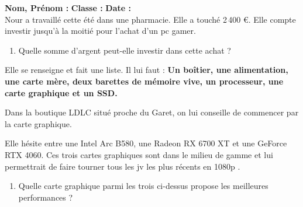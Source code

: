 



\textbf{Nom, Prénom :} \hspace{8cm} \textbf{Classe :} \hspace{3cm} \textbf{Date :}\\

Nour a travaillé cette été dans une pharmacie. Elle a touché 2\,400 \euro{}. Elle compte investir jusqu'à la moitié pour l'achat d'un pc gamer. 

\begin{enumerate}
  \item[1.] Quelle somme d'argent peut-elle investir dans cette achat ?
\end{enumerate}
\Pointilles[2]

\begin{multicols}{2}
Elle se renseigne et fait une liste. Il lui faut : \textbf{Un boîtier, une alimentation, une carte mère, deux barettes de mémoire vive, un processeur, une carte graphique et un SSD.}


Dans la boutique LDLC situé proche du Garet, on lui conseille de commencer par la carte graphique. 

Elle hésite entre une Intel Arc B580, une Radeon RX 6700 XT et une GeForce RTX 4060. Ces trois cartes graphiques sont dans le milieu de gamme et lui permettrait de faire tourner \og tous les jv les plus récents en 1080p \fg{}. 

\begin{enumerate}
  \item[2.] Quelle carte graphique parmi les trois ci-dessus propose les meilleures performances ?
\end{enumerate}

\Pointilles[4] \columnbreak


\end{multicols}
